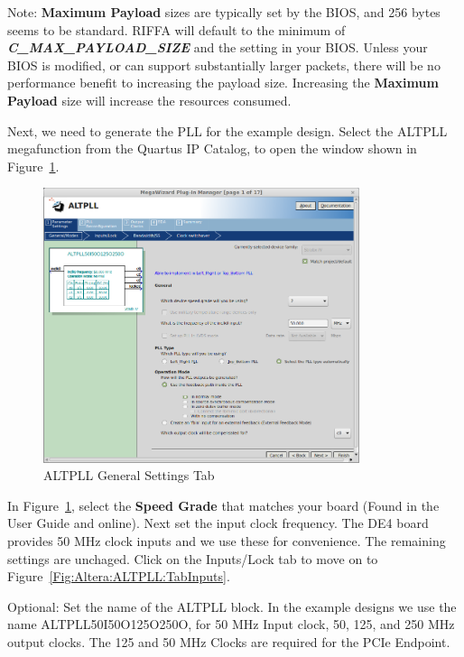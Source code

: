 \documentclass{refrep}
\newcommand{\ConfigSetting}[1]{\textbf{#1}}
\newcommand{\RIFFAParameter}[1]{\textit{\textbf{#1}}}
\begin{document}
Note: \ConfigSetting{Maximum Payload} sizes are typically set by the BIOS, and
256 bytes seems to be standard. RIFFA will default to the minimum of
\RIFFAParameter{C\_MAX\_PAYLOAD\_SIZE} and the setting in your BIOS. Unless your
BIOS is modified, or can support substantially larger packets, there will be no
performance benefit to increasing the payload size. Increasing the
\ConfigSetting{Maximum Payload} size will increase the resources consumed.

Next, we need to generate the PLL for the example design. Select the ALTPLL
megafunction from the Quartus IP Catalog, to open the window shown in
Figure~\ref{Fig:Altera:ALTPLL:TabGeneral}.
\begin{figure}[H]
  \includegraphics[width=350px,center]{ALTPLLTabGeneral.png}
  \caption{ALTPLL General Settings Tab}
  \label{Fig:Altera:ALTPLL:TabGeneral}
\end{figure}
In Figure~\ref{Fig:Altera:ALTPLL:TabGeneral}, select the \ConfigSetting{Speed
  Grade} that matches your board (Found in the User Guide and online). Next set
the input clock frequency. The DE4 board provides 50 MHz clock inputs and we use
these for convenience. The remaining settings are unchaged. Click on the
Inputs/Lock tab to move on to Figure~\ref{Fig:Altera:ALTPLL:TabInputs}.

Optional: Set the name of the ALTPLL block. In the example designs we use the
name ALTPLL50I50O125O250O, for 50 MHz Input clock, 50, 125, and 250 MHz output
clocks. The 125 and 50 MHz Clocks are required for the PCIe Endpoint.
\end{document}
